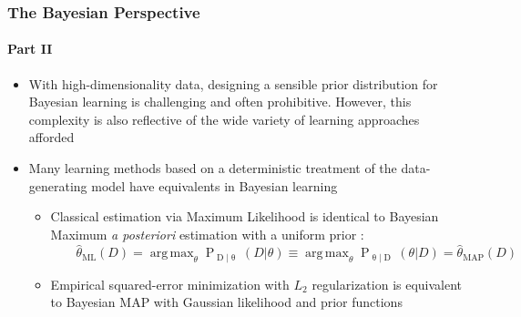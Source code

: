 \documentclass[aspectratio=169,usenames,dvipsnames]{beamer}
\DeclareMathOperator*{\argmin}{arg\,min}
\DeclareMathOperator*{\argmax}{arg\,max}
\DeclareMathOperator{\Drm}{\mathrm{D}}
\DeclareMathOperator{\Trm}{\mathrm{T}}
\DeclareMathOperator{\Prm}{\mathrm{P}}
\DeclareMathOperator{\Ncal}{\mathcal{N}}
\begin{document}
\begin{frame}
\frametitle{The Bayesian Perspective}
\framesubtitle{Part II}

\begin{itemize}
\item With high-dimensionality data, designing a sensible prior distribution for Bayesian learning is challenging and often prohibitive. However, this complexity is also reflective of the wide variety of learning approaches afforded
\vspace{0.5em}
\item Many learning methods based on a deterministic treatment of the data-generating model have \alert{equivalents} in Bayesian learning
\vspace{0.25em}
	\begin{itemize}
	\item Classical estimation via Maximum Likelihood is identical to Bayesian Maximum \emph{a posteriori} estimation with a uniform prior : \\
	\vspace{0.25em}
	$\qquad \hat{\theta}_{\mathrm{ML}}(D) = \argmax_{\theta} \Prm_{\Drm | \uptheta}(D | \theta) \equiv \argmax_{\theta} \Prm_{\uptheta | \Drm}(\theta | D) = \hat{\theta}_{\mathrm{MAP}}(D)$
	\vspace{0.25em}
	\item Empirical squared-error minimization with $L_2$ regularization is equivalent to Bayesian MAP with Gaussian likelihood and prior functions 
	\end{itemize}

\end{itemize}


\vspace{0.5em}
\centering
{}
\vspace{0.5em}

\end{frame}
\end{document}
